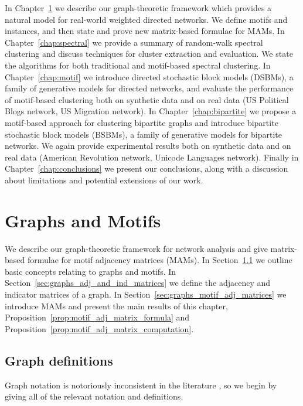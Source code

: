 \documentclass[12pt]{ociamthesis}
\theoremstyle{plain}
\theoremstyle{definition}
\theoremstyle{remark}
\begin{document}
In Chapter~\ref{chap:graphs} we describe our graph-theoretic framework which
provides a natural model for real-world weighted directed networks.
We define motifs and instances, and then state and prove new matrix-based
formulae for MAMs.
%
In Chapter~\ref{chap:spectral} we provide a summary of random-walk spectral
clustering and discuss techniques for cluster extraction and evaluation.
We state the algorithms for both traditional and motif-based spectral
clustering.
%
In Chapter~\ref{chap:motif} we introduce directed stochastic block models
(DSBMs), a family of generative models for directed networks, and evaluate the
performance of motif-based clustering both on synthetic data and on real data
(US Political Blogs network, US Migration network).
%
In Chapter~\ref{chap:bipartite} we propose a motif-based approach for
clustering bipartite graphs and introduce bipartite stochastic block models
(BSBMs), a family of generative models for bipartite networks. We again provide
experimental results both on synthetic data and on real data (American
Revolution network, Unicode Languages network).
%
Finally in Chapter~\ref{chap:conclusions} we present our conclusions, along
with a discussion about limitations and potential extensions of our work.

\clearpage{}
\clearpage{}
\chapter{Graphs and Motifs} \label{chap:graphs}

We describe our graph-theoretic framework for network analysis and give
matrix-based formulae for motif adjacency matrices (MAMs).
In Section~\ref{sec:graphs_graph_definitions} we outline basic concepts
relating to graphs and motifs.
In Section~\ref{sec:graphs_adj_and_ind_matrices} we define the adjacency and
indicator matrices of a graph.
In Section~\ref{sec:graphs_motif_adj_matrices} we introduce MAMs and present
the main results of this chapter,
Proposition~\ref{prop:motif_adj_matrix_formula} and
Proposition~\ref{prop:motif_adj_matrix_computation}.

\section{Graph definitions} \label{sec:graphs_graph_definitions}

Graph notation is notoriously inconsistent in the literature
\cite{intro_to_graph_theory}, so we begin by giving all of the relevant
notation and definitions.
\end{document}
